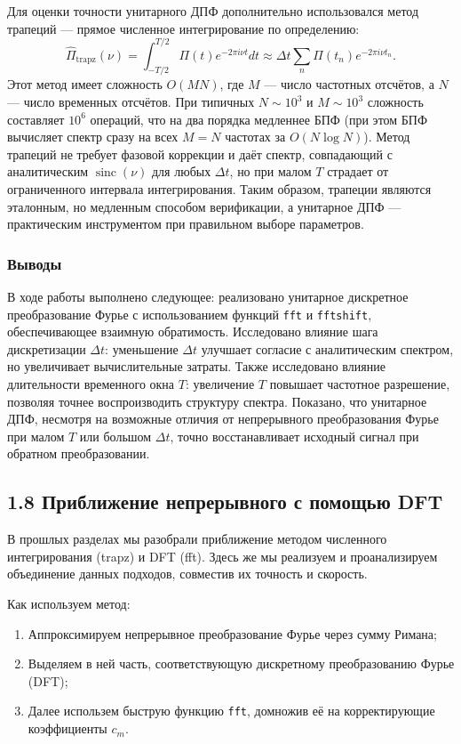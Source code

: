 \documentclass[a4paper, 12pt]{article}
\begin{document}
Для оценки точности унитарного ДПФ дополнительно использовался метод трапеций — прямое численное интегрирование по определению:
\[
\widehat{\Pi}_{\text{trapz}}(\nu) = \int_{-T/2}^{T/2} \Pi(t) e^{-2\pi i \nu t} dt \approx \Delta t \sum_{n} \Pi(t_n) e^{-2\pi i \nu t_n}.
\]
Этот метод имеет сложность $O(M N)$, где $M$ — число частотных отсчётов, а $N$ — число временных отсчётов. При типичных $N \sim 10^3$ и $M \sim 10^3$ сложность составляет $10^6$ операций, что на два порядка медленнее БПФ (при этом БПФ вычисляет спектр сразу на всех $M=N$ частотах за $O(N\log N)$). Метод трапеций не требует фазовой коррекции и даёт спектр, совпадающий с аналитическим $\operatorname{sinc}(\nu)$ для любых $\Delta t$, но при малом $T$ страдает от ограниченного интервала интегрирования. Таким образом, трапеции являются эталонным, но медленным способом верификации, а унитарное ДПФ — практическим инструментом при правильном выборе параметров.

\subsubsection{Выводы}
В ходе работы выполнено следующее: реализовано унитарное дискретное преобразование Фурье с использованием функций \texttt{fft} и \texttt{fftshift}, обеспечивающее взаимную обратимость. Исследовано влияние шага дискретизации $\Delta t$: уменьшение $\Delta t$ улучшает согласие с аналитическим спектром, но увеличивает вычислительные затраты. Также исследовано влияние длительности временного окна $T$: увеличение $T$ повышает частотное разрешение, позволяя точнее воспроизводить структуру спектра. Показано, что унитарное ДПФ, несмотря на возможные отличия от непрерывного преобразования Фурье при малом $T$ или большом $\Delta t$, точно восстанавливает исходный сигнал при обратном преобразовании.

\subsection*{1.8 Приближение непрерывного с помощью DFT}

В прошлых разделах мы разобрали приближение методом численного интегрирования (trapz) и DFT (fft). Здесь же мы реализуем и проанализируем  объединение данных подходов, совместив их точность и скорость. 

Как используем метод:
\begin{enumerate}
    \item Аппроксимируем непрерывное преобразование Фурье через сумму Римана;
    \item Выделяем в ней часть, соответствующую дискретному преобразованию Фурье (DFT);
    \item Далее использем быструю функцию \texttt{fft}, домножив её на  корректирующие коэффициенты $c_m$.
\end{enumerate}
\end{document}
